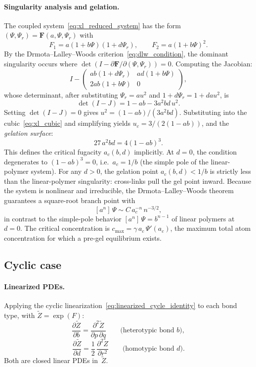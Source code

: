 \documentclass[11pt]{amsart}
\newcommand{\GFspecies}{F}
\newcommand{\GFensemble}{Z}
\newcommand{\GFcomb}{\Psi}
\newcommand{\PDeriv}[2]{\frac{\partial #1}{\partial #2}}
\theoremstyle{definition}
\theoremstyle{plain}
\theoremstyle{remark}
\begin{document}
\paragraph{Singularity analysis and gelation.}
The coupled system~\eqref{eq:xl_reduced_system} has the form $(\Psi,\Psi_r) = \mathbf{F}(a,\Psi,\Psi_r)$ with
\[
F_1 = a(1+b\Psi)(1+d\Psi_r),
\qquad
F_2 = a(1+b\Psi)^2.
\]
By the Drmota--Lalley--Woods criterion~\eqref{eq:dlw_condition}, the dominant singularity occurs where $\det(I - \partial\mathbf{F}/\partial(\Psi,\Psi_r))=0$.
Computing the Jacobian:
\[
I - \begin{pmatrix}
ab(1+d\Psi_r) & ad(1+b\Psi)\\
2ab(1+b\Psi) & 0
\end{pmatrix},
\]
whose determinant, after substituting $\Psi_r = au^2$ and $1+d\Psi_r = 1+dau^2$, is
\begin{equation}\label{eq:xl_det}
\det(I-J) = 1 - ab - 3a^2 b d\,u^2.
\end{equation}
Setting $\det(I-J)=0$ gives $u^2 = (1-ab)/(3a^2 bd)$.
Substituting into the cubic~\eqref{eq:xl_cubic} and simplifying yields
$u_c = 3/(2(1-ab))$, and the \emph{gelation surface}:
\begin{equation}\label{eq:xl_gelation}
\boxed{27\,a^2 b d = 4(1-ab)^3.}
\end{equation}
This defines the critical fugacity $a_c(b,d)$ implicitly.
At $d=0$, the condition degenerates to $(1-ab)^3=0$, i.e.\ $a_c=1/b$ (the simple pole of the linear-polymer system).
For any $d>0$, the gelation point $a_c(b,d)<1/b$ is strictly less than the linear-polymer singularity: cross-links pull the gel point inward.
Because the system is nonlinear and irreducible, the Drmota--Lalley--Woods theorem guarantees a square-root branch point with
\[
[a^n]\,\GFcomb \sim C\,a_c^{-n}\,n^{-3/2},
\]
in contrast to the simple-pole behavior $[a^n]\,\GFcomb = b^{n-1}$ of linear polymers at $d=0$.
The critical concentration is $c_{\max} = \gamma\,a_c\,\GFcomb'(a_c)$, the maximum total atom concentration for which a pre-gel equilibrium exists.

\subsection{Cyclic case}
\label{sec:crosslinked_cyclic}

\paragraph{Linearized PDEs.}
Applying the cyclic linearization~\eqref{eq:linearized_cycle_identity} to each bond type, with $\widetilde{\GFensemble} = \exp(\GFspecies)$:
\begin{equation}\label{eq:xl_linearized_b}
\PDeriv{\widetilde{\GFensemble}}{b} = \frac{\partial^2 \widetilde{\GFensemble}}{\partial p\,\partial q}
\qquad\text{(heterotypic bond $b$)},
\end{equation}
\begin{equation}\label{eq:xl_linearized_d}
\PDeriv{\widetilde{\GFensemble}}{d} = \frac{1}{2}\,\frac{\partial^2 \widetilde{\GFensemble}}{\partial r^2}
\qquad\text{(homotypic bond $d$)}.
\end{equation}
Both are closed linear PDEs in~$\widetilde{\GFensemble}$.
\end{document}
